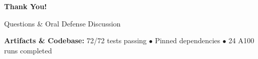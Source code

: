 \documentclass[aspectratio=169]{beamer}
\begin{document}
\begin{frame}
\centering
\vspace{1.5cm}
{\Huge \textbf{Thank You!}}

\bigskip
\bigskip
{\Large Questions \& Oral Defense Discussion}

\bigskip
\bigskip
\footnotesize
\textbf{Artifacts \& Codebase:} 72/72 tests passing $\bullet$ Pinned dependencies $\bullet$ 24 A100 runs completed
\end{frame}
\end{document}
